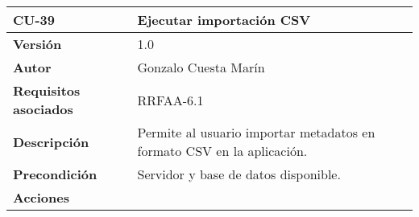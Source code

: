 \begin{longtable}[]{@{}ll@{}}
\toprule
\begin{minipage}[b]{0.16\columnwidth}\raggedright
\textbf{CU-39}\strut
\end{minipage} & \begin{minipage}[b]{0.78\columnwidth}\raggedright
\textbf{Ejecutar importación CSV}\strut
\end{minipage}\tabularnewline
\midrule
\endhead
\begin{minipage}[t]{0.16\columnwidth}\raggedright
\textbf{Versión}\strut
\end{minipage} & \begin{minipage}[t]{0.78\columnwidth}\raggedright
1.0\strut
\end{minipage}\tabularnewline
\begin{minipage}[t]{0.16\columnwidth}\raggedright
\textbf{Autor}\strut
\end{minipage} & \begin{minipage}[t]{0.78\columnwidth}\raggedright
Gonzalo Cuesta Marín\strut
\end{minipage}\tabularnewline
\begin{minipage}[t]{0.16\columnwidth}\raggedright
\textbf{Requisitos asociados}\strut
\end{minipage} & \begin{minipage}[t]{0.78\columnwidth}\raggedright
RRFAA-6.1\strut
\end{minipage}\tabularnewline
\begin{minipage}[t]{0.16\columnwidth}\raggedright
\textbf{Descripción}\strut
\end{minipage} & \begin{minipage}[t]{0.78\columnwidth}\raggedright
Permite al usuario importar metadatos en formato CSV en la
aplicación.\strut
\end{minipage}\tabularnewline
\begin{minipage}[t]{0.16\columnwidth}\raggedright
\textbf{Precondición}\strut
\end{minipage} & \begin{minipage}[t]{0.78\columnwidth}\raggedright
Servidor y base de datos disponible.\strut
\end{minipage}\tabularnewline
\begin{minipage}[t]{0.16\columnwidth}\raggedright
\textbf{Acciones}\strut
\end{minipage} & \begin{minipage}[t]{0.78\columnwidth}\raggedright
\begin{enumerate}

\end{enumerate}
\end{minipage}
\end{longtable}
